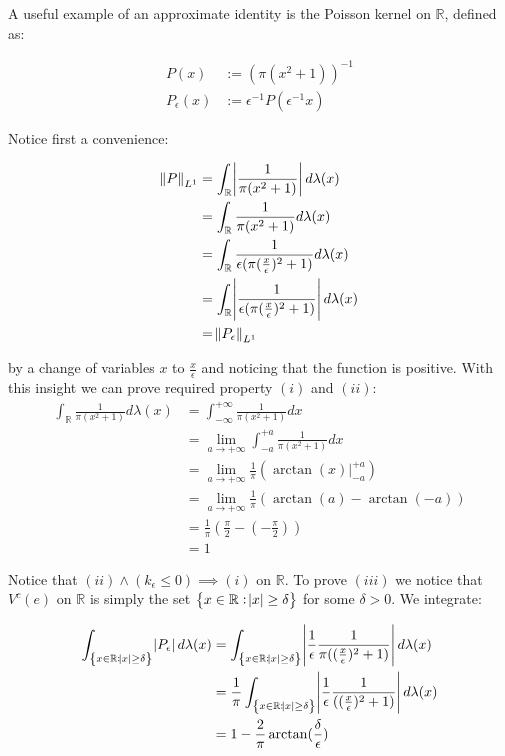 \begin{example}

A useful example of an approximate identity is the Poisson kernel on $\mathbb{R}$, defined as:

\begin{align*}
P(x) &:= (\pi(x^2+1))^{-1} \\
P_\epsilon(x) &:= \epsilon^{-1}P(\epsilon^{-1}x)
\end{align*}

Notice first a convenience:

\begin{align*}
\norm{P}_{L^1} &= \int_\mathbb{R} \abs{\frac{1}{ \pi (x^2+1)} } d\lambda(x) \\
&= \int_\mathbb{R} \frac{1}{ \pi (x^2+1)} d\lambda(x) \\
&= \int_\mathbb{R} \frac{1}{\epsilon(\pi (\frac{x}{\epsilon})^2+1)} d\lambda(x)\\
&= \int_\mathbb{R} \abs{ \frac{1}{\epsilon(\pi (\frac{x}{\epsilon})^2+1)}} d\lambda(x)\\
&= \norm{P_\epsilon}_{L^1}
\end{align*}

by a change of variables $x$ to $\frac{x}{\epsilon}$ and noticing that the function is positive. With this insight we can prove required property $(i)$ and $(ii)$:
\begin{align*}
\int_\mathbb{R} \frac{1}{\pi(x^2+1)} d\lambda(x) &= \int_{-\infty}^{+\infty} \frac{1}{\pi(x^2+1)} dx \\
&= \lim_{a\to +\infty} \int_{-a}^{+a} \frac{1}{\pi(x^2+1)} dx \\
&= \lim_{a\to +\infty} \frac{1}{\pi}( \arctan(x) \vert_{-a}^{+a}) \\
&= \lim_{a\to +\infty} \frac{1}{\pi} (\arctan(a) - \arctan(-a)) \\
&= \frac{1}{\pi} (\frac{\pi}{2} - (- \frac{\pi}{2})) \\
&= 1
\end{align*}

Notice that $(ii) \wedge (k_\epsilon \leq 0) \implies (i)$ on $\mathbb{R}$. To prove $(iii)$ we notice that $V^c(e)$ on $\mathbb{R}$ is simply the set $\cbr{ x \in \mathbb{R} : \abs{x} \geq \delta}$ for some $\delta > 0$. We integrate:

\begin{align*}
\int_{\cbr{ x \in \mathbb{R} : \abs{x} \geq \delta}} \abs{P_\epsilon} d\lambda(x) &= \int_{\cbr{ x \in \mathbb{R} : \abs{x} \geq \delta}} \abs{\frac{1}{\epsilon}\frac{1}{\pi((\frac{x}{\epsilon})^2+1)}} d\lambda(x) \\
&= \frac{1}{\pi} \int_{\cbr{ x \in \mathbb{R} : \abs{x} \geq \delta}} \abs{\frac{1}{\epsilon}\frac{1}{((\frac{x}{\epsilon})^2+1)}} d\lambda(x)\\
&= 1 - \frac{2}{\pi} \arctan(\frac{\delta}{\epsilon})
\end{align*}


\end{example}
